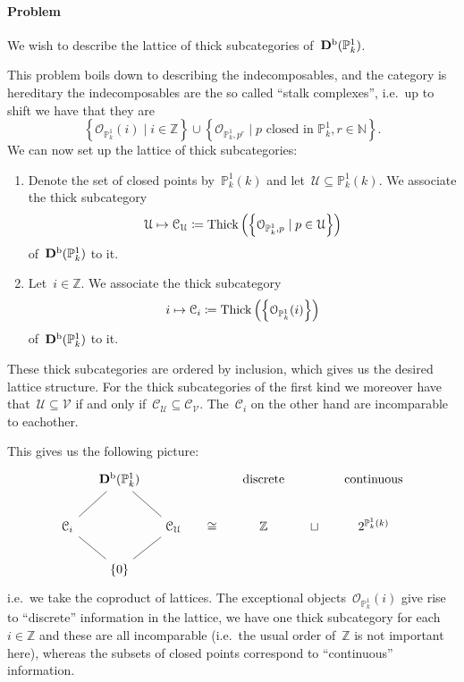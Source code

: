 \documentclass[10pt,a4paper]{article}
\begin{document}
\paragraph{Problem} We wish to describe the lattice of thick subcategories of~$\mathbf{D}^{\mathrm{b}}(\mathbb{P}_k^1)$.

This problem boils down to describing the indecomposables, and the category is hereditary the indecomposables are the so called ``stalk complexes'', i.e.\ up to shift we have that they are
\begin{equation}
  \left\{ \mathcal{O}_{\mathbb{P}_k^1}(i)\mid i\in\mathbb{Z} \right\}\cup\left\{ \mathcal{O}_{\mathbb{P}_k^1,p^r}\mid\text{$p$ closed in $\mathbb{P}_k^1$}, r\in\mathbb{N} \right\}.
\end{equation}
We can now set up the lattice of thick subcategories:
\begin{enumerate}
  \item Denote the set of closed points by~$\mathbb{P}_k^1(k)$ and let~$\mathcal{U}\subseteq\mathbb{P}_k^1(k)$. We associate the thick subcategory
    \begin{equation}
      \mathcal{U}\mapsto\mathcal{C}_{\mathcal{U}}\coloneqq\operatorname{Thick}\left( \left\{ \mathcal{O}_{\mathbb{P}_k^1,p}\mid p\in\mathcal{U} \right\} \right)
    \end{equation}
    of~$\mathbf{D}^{\mathrm{b}}(\mathbb{P}_k^1)$ to it.
  \item Let~$i\in\mathbb{Z}$. We associate the thick subcategory
    \begin{equation}
      i\mapsto\mathcal{C}_i\coloneqq\operatorname{Thick}\left( \left\{ \mathcal{O}_{\mathbb{P}_k^1}(i) \right\} \right)
    \end{equation}
    of~$\mathbf{D}^{\mathrm{b}}(\mathbb{P}_k^1)$ to it.
\end{enumerate}
These thick subcategories are ordered by inclusion, which gives us the desired lattice structure. For the thick subcategories of the first kind we moreover have that~$\mathcal{U}\subseteq\mathcal{V}$ if and only if~$\mathcal{C}_{\mathcal{U}}\subseteq\mathcal{C}_{\mathcal{V}}$. The~$\mathcal{C}_i$ on the other hand are incomparable to eachother.

This gives us the following picture:
\begin{equation}
  \begin{tikzcd}[column sep = small]
    {} & \derived^\bounded(\mathbb{P}_k^1) \arrow[-]{rd} \arrow[-]{ld} & & & \text{discrete} & & \text{continuous} \\
    \mathcal{C}_i \arrow[-]{rd} & & \mathcal{C}_{\mathcal{U}} \arrow[-]{ld} & \cong & \mathbb{Z} & \sqcup & 2^{\mathbb{P}_k^1(k)} \\
    & \left\{ 0 \right\}
  \end{tikzcd}
\end{equation}
i.e.\ we take the coproduct of lattices. The exceptional objects~$\mathcal{O}_{\mathbb{P}_k^1}(i)$ give rise to ``discrete'' information in the lattice, we have one thick subcategory for each~$i\in\mathbb{Z}$ and these are all incomparable (i.e.\ the usual order of~$\mathbb{Z}$ is not important here), whereas the subsets of closed points correspond to ``continuous'' information.
\end{document}
